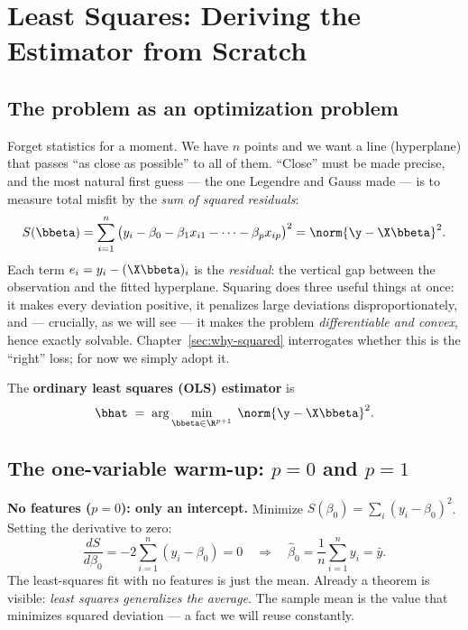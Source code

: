 \section{Least Squares: Deriving the Estimator from Scratch}\label{sec:ls}

\subsection{The problem as an optimization problem}

Forget statistics for a moment. We have $n$ points and we want a line (hyperplane) that passes ``as close as possible'' to all of them. ``Close'' must be made precise, and the most natural first guess — the one Legendre and Gauss made — is to measure total misfit by the \emph{sum of squared residuals}:
\begin{equation}\label{eq:rss}
  S(\bbeta) = \sum_{i=1}^{n} \big( y_i - \beta_0 - \beta_1 x_{i1} - \dots - \beta_p x_{ip} \big)^2
            = \norm{\y - \X \bbeta}^2.
\end{equation}
Each term $e_i = y_i - (\X \bbeta)_i$ is the \emph{residual}: the vertical gap between the observation and the fitted hyperplane. Squaring does three useful things at once: it makes every deviation positive, it penalizes large deviations disproportionately, and — crucially, as we will see — it makes the problem \emph{differentiable and convex}, hence exactly solvable. Chapter~\ref{sec:why-squared} interrogates whether this is the ``right'' loss; for now we simply adopt it.

The \textbf{ordinary least squares (OLS) estimator} is
\[
  \bhat \;=\; \arg\min_{\bbeta \in \R^{p+1}} \; \norm{\y - \X \bbeta}^2.
\]

\subsection{The one-variable warm-up: $p = 0$ and $p = 1$}

\textbf{No features ($p=0$): only an intercept.} Minimize $S(\beta_0) = \sum_i (y_i - \beta_0)^2$. Setting the derivative to zero:
\[
  \frac{dS}{d\beta_0} = -2 \sum_{i=1}^n (y_i - \beta_0) = 0
  \quad\Longrightarrow\quad
  \hat{\beta}_0 = \frac{1}{n} \sum_{i=1}^n y_i = \bar{y}.
\]
The least-squares fit with no features is just the mean. Already a theorem is visible: \emph{least squares generalizes the average}. The sample mean is the value that minimizes squared deviation — a fact we will reuse constantly.


